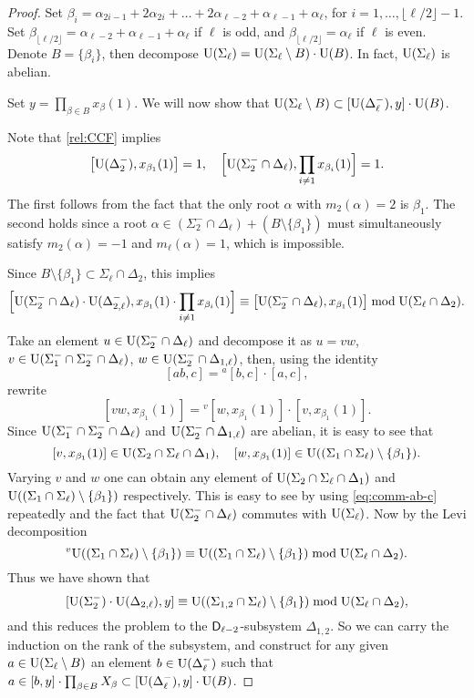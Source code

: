 \begin{proof}
Set $\beta_i = \alpha_{2i-1} + 2\alpha_{2i}+ \ldots + 2\alpha_{\ell-2} + \alpha_{\ell-1} + \alpha_\ell$, for $i=1,\ldots,\lfloor\ell/2\rfloor-1$. Set $\beta_{\lfloor\ell/2\rfloor}=\alpha_{\ell-2}+\alpha_{\ell-1}+\alpha_\ell$ if $\ell$ is odd, and $\beta_{\lfloor\ell/2\rfloor}=\alpha_\ell$ if $\ell$ is even.  Denote $B=\{\beta_i\}$, then decompose $\operatorname{U}(\Sigma_\ell)=\operatorname{U}(\Sigma_\ell\setminus B)\cdot\operatorname{U}(B)$. In fact, $\operatorname{U}(\Sigma_\ell)$ is abelian.

Set $y=\prod_{\beta\in B}x_\beta(1)$. We will now show that $\operatorname{U}(\Sigma_\ell\setminus B)\subset[\operatorname{U}(\Delta_\ell^-),y]\cdot\operatorname{U}(B)$.

Note that \eqref{rel:CCF} implies
\[ \bigl[\operatorname{U}(\Delta_2^-),x_{\beta_1}(1)\bigr]=1,\quad \Bigl[\operatorname{U}(\Sigma_2^-\cap\Delta_\ell),\prod_{i\neq1}x_{\beta_i}(1)\Bigr]=1. \]
The first follows from the fact that the only root $\alpha$ with $m_2(\alpha)=2$ is $\beta_1$. The second holds since a root $\alpha\in(\Sigma_2^-\cap\Delta_\ell)+(B\setminus\{\beta_1\})$ must simultaneously satisfy $m_2(\alpha)=-1$ and $m_\ell(\alpha)=1$, which is impossible.

Since $B\setminus\{\beta_1\}\subset\Sigma_\ell\cap\Delta_2$, this implies
\[ \Bigl[ \operatorname{U}(\Sigma_2^-\cap\Delta_\ell)\cdot\operatorname{U}(\Delta_{2,\ell}^-), x_{\beta_1}(1)\cdot\prod_{i\neq1}x_{\beta_i}(1) \Bigr] \equiv \bigl[ \operatorname{U}(\Sigma_2^-\cap\Delta_\ell), x_{\beta_1}(1) \bigr] \bmod \operatorname{U}(\Sigma_\ell\cap\Delta_2). \]
Take an element $u\in\operatorname{U}(\Sigma_2^-\cap\Delta_\ell)$ and decompose it as $u=vw$, $v\in\operatorname{U}(\Sigma_1^-\cap\Sigma_2^-\cap\Delta_\ell)$, $w\in\operatorname{U}(\Sigma_2^-\cap\Delta_{1,\ell})$, then, using the identity
\begin{equation}\label{eq:comm-ab-c}
[ab,c]={}^a[b,c]\cdot[a,c],
\end{equation}
rewrite
\[ [vw,x_{\beta_1}(1)] = {}^v[w,x_{\beta_1}(1)]\cdot[v,x_{\beta_1}(1)].  \]
Since $\operatorname{U}(\Sigma_1^-\cap\Sigma_2^-\cap\Delta_\ell)$ and $\operatorname{U}(\Sigma_2^-\cap\Delta_{1,\ell})$ are abelian, it is easy to see that
\[ [v,x_{\beta_1}(1)]\in\operatorname{U}(\Sigma_2\cap\Sigma_\ell\cap\Delta_1), \quad [w,x_{\beta_1}(1)]\in\operatorname{U}((\Sigma_1\cap\Sigma_\ell)\setminus\{\beta_1\}). \]
Varying $v$ and $w$ one can obtain any element of $\operatorname{U}(\Sigma_2\cap\Sigma_\ell\cap\Delta_1)$ and $\operatorname{U}((\Sigma_1\cap\Sigma_\ell)\setminus\{\beta_1\})$ respectively. This is easy to see by using \eqref{eq:comm-ab-c} repeatedly and the fact that $\operatorname{U}(\Sigma_2^-\cap\Delta_\ell)$ commutes with $\operatorname{U}(\Sigma_\ell)$.
Now by the Levi decomposition
\[ {}^v\!\operatorname{U}((\Sigma_1\cap\Sigma_\ell)\setminus\{\beta_1\}) \equiv \operatorname{U}((\Sigma_1\cap\Sigma_\ell)\setminus\{\beta_1\}) \bmod \operatorname{U}(\Sigma_\ell\cap\Delta_2). \]
Thus we have shown that
\[ [\operatorname{U}(\Sigma_2^-)\cdot\operatorname{U}(\Delta_{2,\ell}),y] \equiv \operatorname{U}((\Sigma_{1,2}\cap\Sigma_\ell)\setminus\{\beta_1\}) \bmod \operatorname{U}(\Sigma_\ell\cap\Delta_2), \]
and this reduces the problem to the $\mathsf{D}_{\ell-2}$-subsystem $\Delta_{1,2}$. So we can carry the induction on the rank of the subsystem, and construct for any given $a\in\operatorname{U}(\Sigma_\ell\setminus B)$ an element $b\in\operatorname{U}(\Delta_\ell^-)$ such that $a\in[b,y]\cdot\prod_{\beta\in B}X_\beta\subset[\operatorname{U}(\Delta_\ell^-),y]\cdot\operatorname{U}(B)$.


\end{proof}
